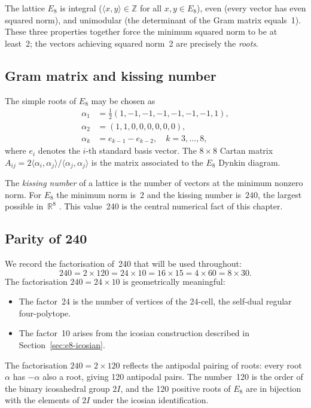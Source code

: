 The lattice \(E_8\) is integral (\(\langle x,y\rangle \in \mathbb{Z}\)
for all \(x,y \in E_8\)), even (every vector has even squared norm),
and unimodular (the determinant of the Gram matrix equals~1).  These
three properties together force the minimum squared norm to be at
least~2; the vectors achieving squared norm~2 are precisely the
\emph{roots}.

\subsection{Gram matrix and kissing number}
\label{subsec:e8-gram}

The simple roots of \(E_8\) may be chosen as
\begin{align*}
  \alpha_1 &= \tfrac{1}{2}(1,-1,-1,-1,-1,-1,-1,1), \\
  \alpha_2 &= (1,1,0,0,0,0,0,0), \\
  \alpha_k &= e_{k-1} - e_{k-2}, \quad k = 3,\ldots,8,
\end{align*}
where \(e_i\) denotes the \(i\)-th standard basis vector.  The
\(8\times 8\) Cartan matrix \(A_{ij} = 2\langle\alpha_i,\alpha_j
\rangle / \langle\alpha_j,\alpha_j\rangle\) is the matrix associated
to the \(E_8\) Dynkin diagram.

The \emph{kissing number} of a lattice is the number of vectors at
the minimum nonzero norm.  For \(E_8\) the minimum norm is~2 and the
kissing number is~\(240\), the largest possible in~\(\mathbb{R}^8\)
\cite{conway_sphere_packings}.  This value~240 is the central
numerical fact of this chapter.

\subsection{Parity of 240}
\label{subsec:e8-parity}

We record the factorisation of~240 that will be used throughout:
\[
  240 = 2 \times 120 = 24 \times 10 = 16 \times 15
       = 4 \times 60 = 8 \times 30.
\]
The factorisation \(240 = 24 \times 10\) is geometrically meaningful:
\begin{itemize}
  \item The factor~24 is the number of vertices of the
    24-cell, the self-dual regular four-polytope.
  \item The factor~10 arises from the icosian construction described
    in Section~\ref{sec:e8-icosian}.
\end{itemize}

The factorisation \(240 = 2 \times 120\) reflects the antipodal
pairing of roots: every root \(\alpha\) has \(-\alpha\) also a root,
giving 120 antipodal pairs.  The number~120 is the order of the
binary icosahedral group \(2I\), and the 120 positive roots of
\(E_8\) are in bijection with the elements of \(2I\) under the
icosian identification.

